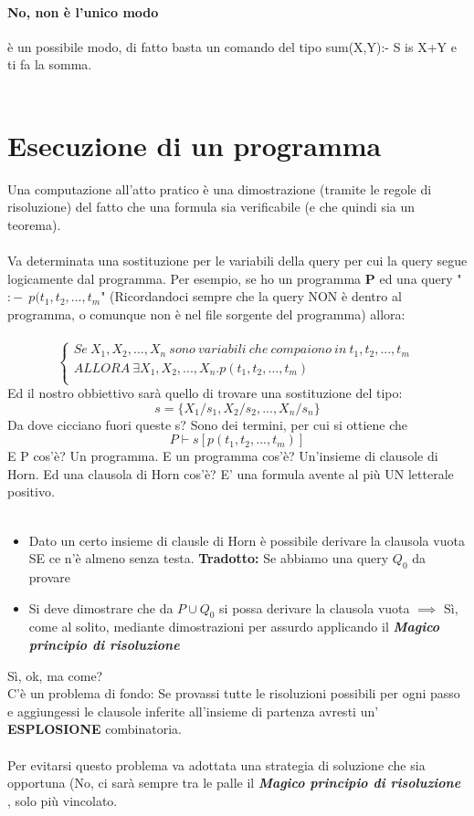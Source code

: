 \documentclass[12pt, a4paper, openany, oneside]{book}
\begin{document}
\paragraph{No, non è l'unico modo} è un possibile modo, di fatto basta un comando
del tipo sum(X,Y):- S is X+Y e ti fa la somma.
\\ \\
\section{Esecuzione di un programma}
Una computazione all'atto pratico è una dimostrazione (tramite le regole di 
risoluzione) del fatto che una formula sia verificabile (e che quindi sia un 
teorema).
\\ \\
Va determinata una sostituzione per le variabili della query per cui la query
segue logicamente dal programma.
Per esempio, se ho un programma \textbf{P} ed una query "$:- ~~ p(t_{1}, t_{2}, ..., t_{m}$"
(Ricordandoci sempre che la query NON è dentro al programma, o comunque non è
nel file sorgente del programma) allora: \\ \\
\[
\begin{cases}
Se ~ X_{1}, X_{2}, ..., X_{n} ~ sono ~ variabili ~ che ~ compaiono ~ in 
~ t_{1}, t_{2}, ..., t_{m} ~ \\ALLORA ~ \exists X_{1}, X_{2}, ..., X_{n} .
p(t_{1}, t_{2}, ..., t_{m}) \\	
\end{cases}
\]
Ed il nostro obbiettivo sarà quello di trovare una sostituzione del tipo:
\[
s = \{X_{1}/s_{1}, X_{2}/s_{2}, ..., X_{n}/s_{n}\}
\]
Da dove cicciano fuori queste s? Sono dei termini, per cui si ottiene che
\[
P \vdash s[p(t_{1}, t_{2}, ..., t_{m})]
\]
E P cos'è? Un programma. E un programma cos'è? Un'insieme di clausole di Horn.
Ed una clausola di Horn cos'è? E' una formula avente al più UN letterale positivo.
\\ \\
\begin{itemize}
	\item Dato un certo insieme di clausle di Horn è possibile derivare la clausola vuota
	SE ce n'è almeno senza testa. \textbf{Tradotto: } Se abbiamo una query $Q_{0}$ da
	provare
	\item Si deve dimostrare che da $P \cup {Q_{0}}$ si possa derivare la
	clausola vuota $\implies$ Sì, come al solito, mediante dimostrazioni per
	assurdo applicando il \color{red} \textbf{\textit{Magico principio di risoluzione
	}} \color{black}
\end{itemize}
Sì, ok, ma come?\\
C'è un problema di fondo: Se provassi tutte le risoluzioni possibili per ogni passo
e aggiungessi le clausole inferite all'insieme di partenza avresti un'\textbf{
ESPLOSIONE 
} combinatoria. \\ \\
Per evitarsi questo problema va adottata una strategia di soluzione che sia 
opportuna (No, ci sarà sempre tra le palle il \color{red} \textbf{\textit{Magico 
principio di risoluzione}} \color{black}, solo più vincolato. \\
\end{document}

